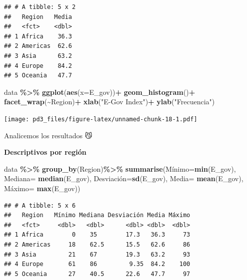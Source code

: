\documentclass[
]{article}
\newenvironment{Shaded}{\begin{snugshade}}{\end{snugshade}}
\newcommand{\AttributeTok}[1]{\textcolor[rgb]{0.13,0.29,0.53}{#1}}
\newcommand{\FunctionTok}[1]{\textcolor[rgb]{0.13,0.29,0.53}{\textbf{#1}}}
\newcommand{\NormalTok}[1]{#1}
\newcommand{\OtherTok}[1]{\textcolor[rgb]{0.56,0.35,0.01}{#1}}
\newcommand{\SpecialCharTok}[1]{\textcolor[rgb]{0.81,0.36,0.00}{\textbf{#1}}}
\newcommand{\StringTok}[1]{\textcolor[rgb]{0.31,0.60,0.02}{#1}}
\begin{document}
\begin{verbatim}
## # A tibble: 5 x 2
##   Region   Media
##   <fct>    <dbl>
## 1 Africa    36.3
## 2 Americas  62.6
## 3 Asia      63.2
## 4 Europe    84.2
## 5 Oceania   47.7
\end{verbatim}

\begin{Shaded}
\begin{Highlighting}[]
\NormalTok{data }\SpecialCharTok{\%\textgreater{}\%}
  \FunctionTok{ggplot}\NormalTok{(}\FunctionTok{aes}\NormalTok{(}\AttributeTok{x=}\NormalTok{E\_gov))}\SpecialCharTok{+}
  \FunctionTok{geom\_histogram}\NormalTok{()}\SpecialCharTok{+}
  \FunctionTok{facet\_wrap}\NormalTok{(}\SpecialCharTok{\textasciitilde{}}\NormalTok{Region)}\SpecialCharTok{+}
  \FunctionTok{xlab}\NormalTok{(}\StringTok{"E{-}Gov Index"}\NormalTok{)}\SpecialCharTok{+}
  \FunctionTok{ylab}\NormalTok{(}\StringTok{"Frecuencia"}\NormalTok{)}
\end{Highlighting}
\end{Shaded}

\texttt{[image: pd3\_files/figure-latex/unnamed-chunk-18-1.pdf]}

Analicemos los resultados 😼

\textbf{Descriptivos por región}

\begin{Shaded}
\begin{Highlighting}[]
\NormalTok{ data }\SpecialCharTok{\%\textgreater{}\%}
  \FunctionTok{group\_by}\NormalTok{(Region)}\SpecialCharTok{\%\textgreater{}\%}
  \FunctionTok{summarise}\NormalTok{(Mínimo}\OtherTok{=}\FunctionTok{min}\NormalTok{(E\_gov), }
            \AttributeTok{Mediana=} \FunctionTok{median}\NormalTok{(E\_gov), }
\NormalTok{            Desviación}\OtherTok{=}\FunctionTok{sd}\NormalTok{(E\_gov),}
            \AttributeTok{Media=} \FunctionTok{mean}\NormalTok{(E\_gov),}
\NormalTok{            Máximo}\OtherTok{=} \FunctionTok{max}\NormalTok{(E\_gov))}
\end{Highlighting}
\end{Shaded}

\begin{verbatim}
## # A tibble: 5 x 6
##   Region   Mínimo Mediana Desviación Media Máximo
##   <fct>     <dbl>   <dbl>      <dbl> <dbl>  <dbl>
## 1 Africa        0    35        17.3   36.3     73
## 2 Americas     18    62.5      15.5   62.6     86
## 3 Asia         21    67        19.3   63.2     93
## 4 Europe       61    86         9.35  84.2    100
## 5 Oceania      27    40.5      22.6   47.7     97
\end{verbatim}
\end{document}
